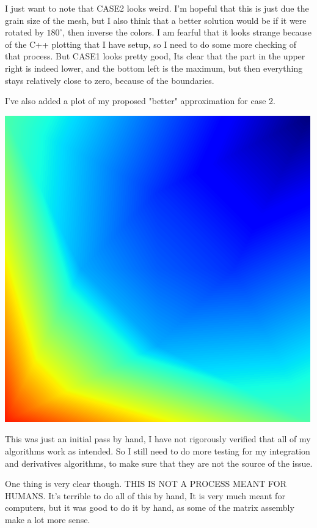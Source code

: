 \documentclass[9pt]{amsart}
\newenvironment{Figure}
{\par\medskip\noindent\minipage{\linewidth}}
{\endminipage\par\medskip}
\begin{document}
I just want to note that CASE2 looks weird. I'm hopeful that this is just due
the grain size of the mesh, but I also think that a better solution would be if
it were rotated by $180^\circ$, then inverse the colors. I am fearful that it
looks strange because of the C++ plotting that I have setup, so I need to do
some more checking of that process. But CASE1 looks pretty good, Its clear that
the part in the upper right is indeed lower, and the bottom left is the
maximum, but then everything stays relatively close to zero, because of the
boundaries.

I've also added a plot of my proposed "better" approximation for case 2.

\begin{Figure}
   \begin{center}
     \includegraphics[width=0.5\linewidth]{CASE_2b.png}
   \end{center}
   \label{fig:CASE_2b}
\end{Figure}

This was just an initial pass by hand, I have not rigorously verified that all
of my algorithms work as intended. So I still need to do more testing for my
integration and derivatives algorithms, to make sure that they are not the
source of the issue.

One thing is very clear though. THIS IS NOT A PROCESS MEANT FOR HUMANS. It's
terrible to do all of this by hand, It is very much meant for computers, but it
was good to do it by hand, as some of the matrix assembly make a lot more
sense.
\end{document}
